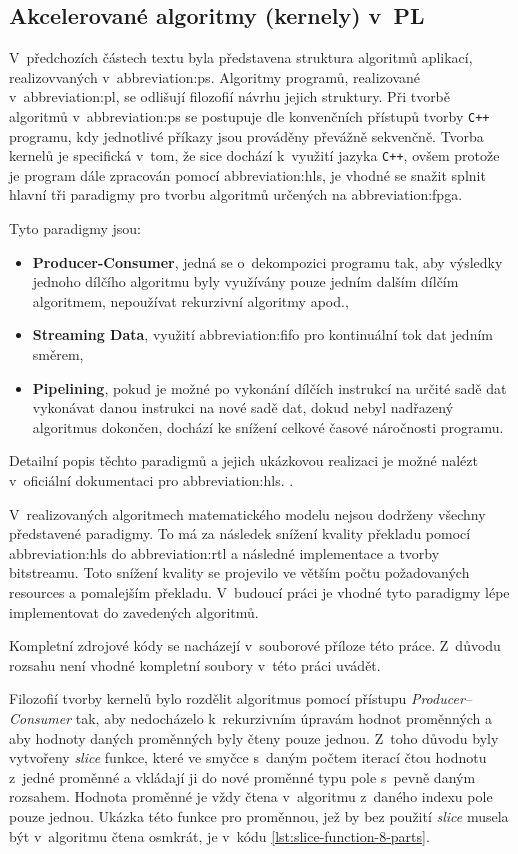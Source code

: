 \documentclass[a4paper, twoside, 11pt]{article}
\begin{document}
	\subsection{Akcelerované algoritmy (kernely) v~PL}\label{subsec:akcelerovane-algoritmy-kernely-v-pl}
		V~předchozích částech textu byla představena struktura algoritmů aplikací, realizovvaných v~\gls{abbreviation:ps}. Algoritmy programů, realizované v~\gls{abbreviation:pl}, se odlišují filozofií návrhu jejich struktury. Při tvorbě algoritmů v~\gls{abbreviation:ps} se postupuje dle konvenčních přístupů tvorby \texttt{C++} programu, kdy jednotlivé příkazy jsou prováděny převážně sekvenčně. Tvorba kernelů je specifická v~tom, že sice dochází k~využití jazyka \texttt{C++}, ovšem protože je program dále zpracován pomocí \gls{abbreviation:hls}, je vhodné se snažit splnit hlavní tři paradigmy pro tvorbu algoritmů určených na \gls{abbreviation:fpga}.\par
		Tyto paradigmy jsou:
		\begin{itemize}
			\item \textbf{Producer-Consumer}, jedná se o~dekompozici programu tak, aby výsledky jednoho dílčího algoritmu byly využívány pouze jedním dalším dílčím algoritmem, nepoužívat rekurzivní algoritmy apod.,
			\item \textbf{Streaming Data}, využití \gls{abbreviation:fifo} pro kontinuální tok dat jedním směrem,
			\item \textbf{Pipelining}, pokud je možné po vykonání dílčích instrukcí na určité sadě dat vykonávat danou instrukci na nové sadě dat, dokud nebyl nadřazený algoritmus dokončen, dochází ke snížení celkové časové náročnosti programu. 
		\end{itemize}
		Detailní popis těchto paradigmů a jejich ukázkovou realizaci je možné nalézt v~oficiální dokumentaci pro \gls{abbreviation:hls}. \cite{vitis-high-level-synthesis-user-guide}.\par
		V~realizovaných algoritmech matematického modelu nejsou dodrženy všechny představené paradigmy. To má za následek snížení kvality překladu pomocí \gls{abbreviation:hls} do \gls{abbreviation:rtl} a následné implementace a tvorby bitstreamu. Toto snížení kvality se projevilo ve větším počtu požadovaných resources a pomalejším překladu. V~budoucí práci je vhodné tyto paradigmy lépe implementovat do zavedených algoritmů.\par
		Kompletní zdrojové kódy se nacházejí v~souborové příloze této práce. Z~důvodu rozsahu není vhodné kompletní soubory v~této práci uvádět.\par
		Filozofií tvorby kernelů bylo rozdělit algoritmus pomocí přístupu \textit{Producer–Consumer} tak, aby nedocházelo k~rekurzivním úpravám hodnot proměnných a aby hodnoty daných proměnných byly čteny pouze jednou. Z~toho důvodu byly vytvořeny \textit{slice} funkce, které ve smyčce s~daným počtem iterací čtou hodnotu z~jedné proměnné a vkládají ji do nové proměnné typu pole s~pevně daným rozsahem. Hodnota proměnné je vždy čtena v~algoritmu z~daného indexu pole pouze jednou. Ukázka této funkce pro proměnnou, jež by bez použití \textit{slice} musela být v~algoritmu čtena osmkrát, je v~kódu \ref{lst:slice-function-8-parts}.\par
\end{document}
